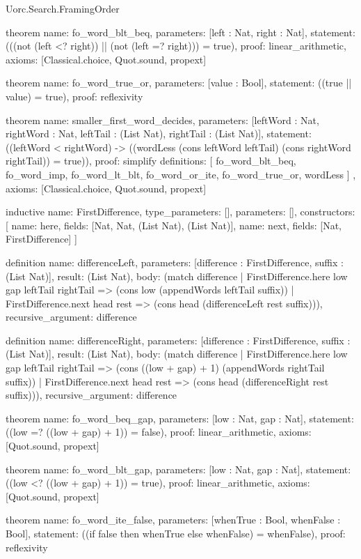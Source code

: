 \begin{lexlean}{Uorc.Search.FramingOrder}
\begin{semanticmodule}
theorem{
  name: fo_word_blt_beq,
  parameters: [left : Nat, right : Nat],
  statement: (((not (left <? right)) || (not (left =? right))) = true),
  proof: linear_arithmetic{},
  axioms: [Classical.choice, Quot.sound, propext]
}

theorem{
  name: fo_word_true_or,
  parameters: [value : Bool],
  statement: ((true || value) = true),
  proof: reflexivity{}
}

theorem{
  name: smaller_first_word_decides,
  parameters: [leftWord : Nat, rightWord : Nat, leftTail : (List Nat), rightTail : (List Nat)],
  statement: ((leftWord < rightWord) -> ((wordLess (cons leftWord leftTail) (cons rightWord rightTail)) = true)),
  proof: simplify{
    definitions: [
      fo_word_blt_beq,
      fo_word_imp,
      fo_word_lt_blt,
      fo_word_or_ite,
      fo_word_true_or,
      wordLess
    ]
  },
  axioms: [Classical.choice, Quot.sound, propext]
}

inductive{
  name: FirstDifference,
  type_parameters: [],
  parameters: [],
  constructors: [
    {name: here, fields: [Nat, Nat, (List Nat), (List Nat)]},
    {name: next, fields: [Nat, FirstDifference]}
  ]
}

definition{
  name: differenceLeft,
  parameters: [difference : FirstDifference, suffix : (List Nat)],
  result: (List Nat),
  body: (match difference
    | FirstDifference.here low gap leftTail rightTail => (cons low (appendWords leftTail suffix))
    | FirstDifference.next head rest => (cons head (differenceLeft rest suffix))),
  recursive_argument: difference
}

definition{
  name: differenceRight,
  parameters: [difference : FirstDifference, suffix : (List Nat)],
  result: (List Nat),
  body: (match difference
    | FirstDifference.here low gap leftTail rightTail => (cons ((low + gap) + 1) (appendWords rightTail suffix))
    | FirstDifference.next head rest => (cons head (differenceRight rest suffix))),
  recursive_argument: difference
}

theorem{
  name: fo_word_beq_gap,
  parameters: [low : Nat, gap : Nat],
  statement: ((low =? ((low + gap) + 1)) = false),
  proof: linear_arithmetic{},
  axioms: [Quot.sound, propext]
}

theorem{
  name: fo_word_blt_gap,
  parameters: [low : Nat, gap : Nat],
  statement: ((low <? ((low + gap) + 1)) = true),
  proof: linear_arithmetic{},
  axioms: [Quot.sound, propext]
}

theorem{
  name: fo_word_ite_false,
  parameters: [whenTrue : Bool, whenFalse : Bool],
  statement: ((if false then whenTrue else whenFalse) = whenFalse),
  proof: reflexivity{}
}


\end{semanticmodule}
\end{lexlean}
